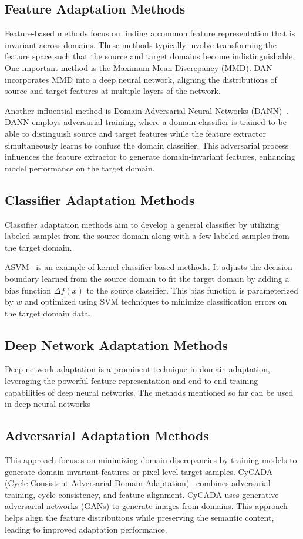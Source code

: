  \subsection{Feature Adaptation Methods}
 \label{Feature}
 Feature-based methods focus on finding a common feature representation that is invariant across domains. These methods typically involve transforming the feature space such that the source and target domains become indistinguishable. One important method is the Maximum Mean Discrepancy (MMD). DAN~\cite{featureMethod} incorporates MMD into a deep neural network, aligning the distributions of source and target features at multiple layers of the network. %
 
 Another influential method is Domain-Adversarial Neural Networks (DANN)~\cite{featureMethod2}. DANN employs adversarial training, where a domain classifier is trained to be able to distinguish source and target features while the feature extractor simultaneously learns to confuse the domain classifier. This adversarial process influences the feature extractor to generate domain-invariant features, enhancing model performance on the target domain.
 
\subsection{Classifier Adaptation Methods}
\label{Classifier}
Classifier adaptation methods aim to develop a general classifier by utilizing labeled samples from the source domain along with a few labeled samples from the target domain.

ASVM~\cite{asvm} is an example of kernel classifier-based methods. It adjusts the decision boundary learned from the source domain to fit the target domain by adding a bias function $\Delta f(x)$ to the source classifier. This bias function is parameterized by $w$ and optimized using SVM techniques to minimize classification errors on the target domain data. 
 
 \subsection{Deep Network Adaptation Methods}
Deep network adaptation is a prominent technique in domain adaptation, leveraging the powerful feature representation and end-to-end training capabilities of deep neural networks. The methods mentioned so far can be used in deep neural networks


\subsection{Adversarial Adaptation Methods}
This approach focuses on minimizing domain discrepancies by training models to generate domain-invariant features or pixel-level target samples. CyCADA (Cycle-Consistent Adversarial Domain Adaptation)~\cite{hybridMethod} combines adversarial training, cycle-consistency, and feature alignment. CyCADA uses generative adversarial networks (GANs) to generate images from domains. This approach helps align the feature distributions while preserving the semantic content, leading to improved adaptation performance.

